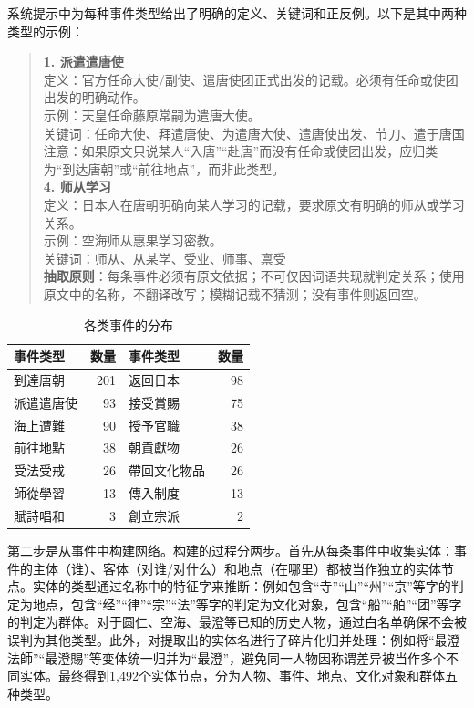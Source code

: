 \documentclass[12pt,a4paper]{article}
\begin{document}
系统提示中为每种事件类型给出了明确的定义、关键词和正反例。以下是其中两种类型的示例：

\begin{quote}
\small
\textbf{1. 派遣遣唐使}\\
定义：官方任命大使/副使、遣唐使团正式出发的记载。必须有任命或使团出发的明确动作。\\
示例：天皇任命藤原常嗣为遣唐大使。\\
关键词：任命大使、拜遣唐使、为遣唐大使、遣唐使出发、节刀、遣于唐国\\
注意：如果原文只说某人“入唐”“赴唐”而没有任命或使团出发，应归类为“到达唐朝”或“前往地点”，而非此类型。\\[4pt]
\textbf{4. 师从学习}\\
定义：日本人在唐朝明确向某人学习的记载，要求原文有明确的师从或学习关系。\\
示例：空海师从惠果学习密教。\\
关键词：师从、从某学、受业、师事、禀受\\[4pt]
\textbf{抽取原则}：每条事件必须有原文依据；不可仅因词语共现就判定关系；使用原文中的名称，不翻译改写；模糊记载不猜测；没有事件则返回空。
\end{quote}

\begin{table}[H]
\centering
\caption{各类事件的分布}
\label{tab:event_types}
\begin{tabular}{lrlr}
\toprule
\textbf{事件类型} & \textbf{数量} & \textbf{事件类型} & \textbf{数量} \\
\midrule
到達唐朝 & 201 & 返回日本 & 98 \\
派遣遣唐使 & 93 & 接受賞賜 & 75 \\
海上遭難 & 90 & 授予官職 & 38 \\
前往地點 & 38 & 朝貢獻物 & 26 \\
受法受戒 & 26 & 帶回文化物品 & 26 \\
師從學習 & 13 & 傳入制度 & 13 \\
賦詩唱和 & 3 & 創立宗派 & 2 \\
\bottomrule
\end{tabular}
\end{table}

第二步是从事件中构建网络。构建的过程分两步。首先从每条事件中收集实体：事件的主体（谁）、客体（对谁/对什么）和地点（在哪里）都被当作独立的实体节点。实体的类型通过名称中的特征字来推断：例如包含“寺”“山”“州”“京”等字的判定为地点，包含“经”“律”“宗”“法”等字的判定为文化对象，包含“船”“舶”“团”等字的判定为群体。对于圆仁、空海、最澄等已知的历史人物，通过白名单确保不会被误判为其他类型。此外，对提取出的实体名进行了碎片化归并处理：例如将“最澄法師”“最澄賜”等变体统一归并为“最澄”，避免同一人物因称谓差异被当作多个不同实体。最终得到1,492个实体节点，分为人物、事件、地点、文化对象和群体五种类型。
\end{document}
